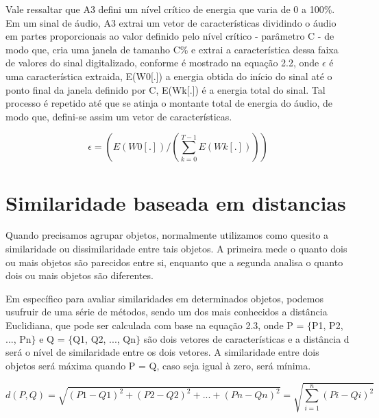 \documentclass[a4paper,12pt,twoside,openright]{report}
\begin{document}
\par Vale ressaltar que A3 defini um n\'{i}vel cr\'{i}tico de energia que varia de 0 a 100{\%}. Em um sinal de \'{a}udio, A3 extrai um vetor de caracter\'{i}sticas dividindo o \'{a}udio em partes proporcionais ao valor definido pelo n\'{i}vel cr\'{i}tico - par\^{a}metro C - de modo que, cria uma janela de tamanho C{\%} e extrai a caracter\'{i}stica dessa faixa de valores do sinal digitalizado, conforme \'{e} mostrado na equa{\c c}\~{a}o 2.2, onde $\epsilon$ \'{e} uma caracter\'{i}stica extraida, E(W0[.]) a energia obtida do in\'{i}cio do sinal at\'{e} o ponto final da janela definido por C, E(Wk[.]) \'{e} a energia total do sinal. Tal processo \'{e} repetido at\'{e} que se atinja o montante total de energia do \'{a}udio, de modo que, defini-se assim um vetor de caracter\'{i}sticas. 

\begin{equation}
	\epsilon = (E(W0[.]) / (\sum_{k = 0}^{T-1}E(Wk[.])))
\end{equation}  
\section{Similaridade baseada em distancias}
\label{similaridade_baseada_em_distancias}

\par Quando precisamos agrupar objetos, normalmente utilizamos como quesito a similaridade ou dissimilaridade entre tais objetos. A primeira mede o quanto dois ou mais objetos s\~{a}o parecidos entre si, enquanto que a segunda analisa o quanto dois ou mais objetos s\~{a}o diferentes.

\par Em espec\'{i}fico para avaliar similaridades em determinados objetos, podemos usufruir de uma s\'{e}rie de m\'{e}todos, sendo um dos mais conhecidos a dist\^{a}ncia Euclidiana, que pode ser calculada com base na equa{\c c}\~{a}o 2.3, onde P = $\{$P1, P2, ..., Pn$\}$ e Q = $\{$Q1, Q2, ..., Qn$\}$ s\~{a}o dois vetores de caracter\'{i}sticas e a dist\^{a}ncia d ser\'{a} o n\'{i}vel de similaridade entre os dois vetores. A similaridade entre dois objetos ser\'{a} m\'{a}xima quando P = Q, caso seja igual {\`a} zero, ser\'{a} m\'{i}nima.

\begin{equation}
	d(P, Q) = \sqrt{(P1-Q1)^2 + (P2-Q2)^2 + ... + (Pn-Qn)^2} =\sqrt{\sum_{i = 1}^{n}(Pi-Qi)^2}
\end{equation}
\end{document}

